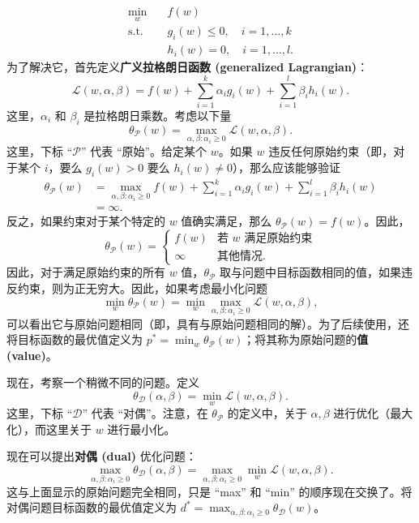 \begin{align*}
    \min_w \quad &f(w)\\
    \text{s.t.} \quad &g_i(w)\leq 0, \quad i=1,\dots,k\\
    \quad &h_i(w)=0, \quad i=1,\dots,l.
\end{align*}
为了解决它，首先定义\textbf{广义拉格朗日函数 (generalized Lagrangian)}：
\[
    \mathcal{L}(w, \alpha, \beta) = f(w) + \sum_{i=1}^k \alpha_i g_i(w) + \sum_{i=1}^l \beta_i h_i(w).
\]
这里，$\alpha_i$ 和 $\beta_i$ 是拉格朗日乘数。考虑以下量
\[
    \theta_{\mathcal{P}}(w) = \max_{\alpha, \beta: \alpha_i \ge 0} \mathcal{L}(w, \alpha, \beta).
\]
这里，下标 “$\mathcal{P}$” 代表 “原始”。给定某个 $w$。如果 $w$ 违反任何原始约束（即，对于某个 $i$，要么 $g_i(w) > 0$ 要么 $h_i(w) \ne 0$），那么应该能够验证
\begin{align}
    \theta_{\mathcal{P}}(w) &= \max_{\alpha, \beta: \alpha_i \ge 0} f(w) + \sum_{i=1}^k \alpha_i g_i(w) + \sum_{i=1}^l \beta_i h_i(w) \label{eq:6.1} \\
    &= \infty. \label{eq:6.2}
\end{align}
反之，如果约束对于某个特定的 $w$ 值确实满足，那么 $\theta_{\mathcal{P}}(w) = f(w)$。因此，
\[
    \theta_{\mathcal{P}}(w) = \begin{cases} f(w) & \text{若 } w \text{ 满足原始约束} \\ \infty & \text{其他情况}. \end{cases}
\]
因此，对于满足原始约束的所有 $w$ 值，$\theta_{\mathcal{P}}$ 取与问题中目标函数相同的值，如果违反约束，则为正无穷大。因此，如果考虑最小化问题
\[
    \min_w \theta_{\mathcal{P}}(w) = \min_w \max_{\alpha, \beta: \alpha_i \ge 0} \mathcal{L}(w, \alpha, \beta),
\]
可以看出它与原始问题相同（即，具有与原始问题相同的解）。为了后续使用，还将目标函数的最优值定义为 $p^* = \min_w \theta_{\mathcal{P}}(w)$；将其称为原始问题的\textbf{值 (value)}。

现在，考察一个稍微不同的问题。定义
\[
    \theta_{\mathcal{D}}(\alpha, \beta) = \min_w \mathcal{L}(w, \alpha, \beta).
\]
这里，下标 “$\mathcal{D}$” 代表 “对偶”。注意，在 $\theta_{\mathcal{P}}$ 的定义中，关于 $\alpha, \beta$ 进行优化（最大化），而这里关于 $w$ 进行最小化。

现在可以提出\textbf{对偶 (dual)} 优化问题：
\[
    \max_{\alpha, \beta: \alpha_i \ge 0} \theta_{\mathcal{D}}(\alpha, \beta) = \max_{\alpha, \beta: \alpha_i \ge 0} \min_w \mathcal{L}(w, \alpha, \beta).
\]
这与上面显示的原始问题完全相同，只是 “max” 和 “min” 的顺序现在交换了。将对偶问题目标函数的最优值定义为 $d^* = \max_{\alpha, \beta: \alpha_i \ge 0} \theta_{\mathcal{D}}(w)$。

